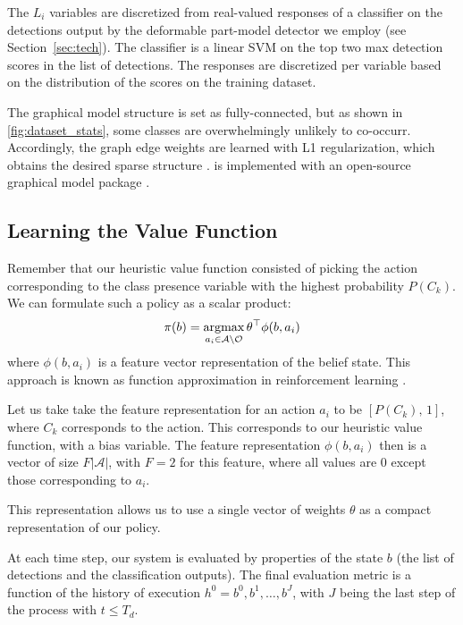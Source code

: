 The $L_i$ variables are discretized from real-valued responses of a classifier on the detections output by the deformable part-model detector we employ (see Section~\ref{sec:tech}).
The classifier is a linear SVM on the top two max detection scores in the list of detections.
The responses are discretized per variable based on the distribution of the scores on the training dataset.

The graphical model structure is set as fully-connected, but as shown in \autoref{fig:dataset_stats}, some classes are overwhelmingly unlikely to co-occurr.
Accordingly, the graph edge weights are learned with L1 regularization, which obtains the desired sparse structure \cite{Lee2006}.
 is implemented with an open-source graphical model package \cite{Jaimovich2010}.


\subsection{Learning the Value Function}

Remember that our heuristic value function consisted of picking the action corresponding to the class presence variable with the highest probability $P(C_k)$.
We can formulate such a policy as a scalar product:
\begin{align}
\pi(b) = \argmax_{a_i \in \mathcal{A} \setminus \mathcal{O}} \theta^\top \phi(b,a_i)
\end{align}
where $\phi(b,a_i)$ is a feature vector representation of the belief state.
This approach is known as function approximation in reinforcement learning \cite{Sutton1998}.

Let us take take the feature representation for an action $a_i$ to be $[P(C_k), \, 1]$, where $C_k$ corresponds to the action.
This corresponds to our heuristic value function, with a bias variable.
The feature representation $\phi(b,a_i)$ then is a vector of size $F|\mathcal{A}|$, with $F=2$ for this feature, where all values are $0$ except those corresponding to $a_i$.

This representation allows us to use a single vector of weights $\theta$ as a compact representation of our policy.

At each time step, our system is evaluated by properties of the state $b$ (the list of detections and the classification outputs).
The final evaluation metric is a function of the history of execution $h^0=b^0,b^1,\dots,b^J$, with $J$ being the last step of the process with $t \le T_d$.

